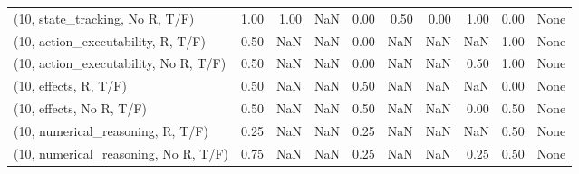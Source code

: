 \begin{table*}[h!]
\begin{adjustbox}{width=2\columnwidth,center}
\begin{tabular}{lrrr|rrr|rrr}
(10, state\_tracking, No R, T/F)       &                      1.00 &                  1.00 &                       NaN &                          0.00 &                      0.50 &                          0.00 &                                   1.00 &                               0.00 &                                  None \\
(10, action\_executability, R, T/F)    &                      0.50 &                   NaN &                       NaN &                          0.00 &                       NaN &                           NaN &                                    NaN &                               1.00 &                                  None \\
(10, action\_executability, No R, T/F) &                      0.50 &                   NaN &                       NaN &                          0.00 &                       NaN &                           NaN &                                   0.50 &                               1.00 &                                  None \\
(10, effects, R, T/F)                 &                      0.50 &                   NaN &                       NaN &                          0.50 &                       NaN &                           NaN &                                    NaN &                               0.00 &                                  None \\
(10, effects, No R, T/F)              &                      0.50 &                   NaN &                       NaN &                          0.50 &                       NaN &                           NaN &                                   0.00 &                               0.50 &                                  None \\
(10, numerical\_reasoning, R, T/F)     &                      0.25 &                   NaN &                       NaN &                          0.25 &                       NaN &                           NaN &                                    NaN &                               0.50 &                                  None \\
(10, numerical\_reasoning, No R, T/F)  &                      0.75 &                   NaN &                       NaN &                          0.25 &                       NaN &                           NaN &                                   0.25 &                               0.50 &                                  None \\

\end{tabular}
\end{adjustbox}
\end{table*}
